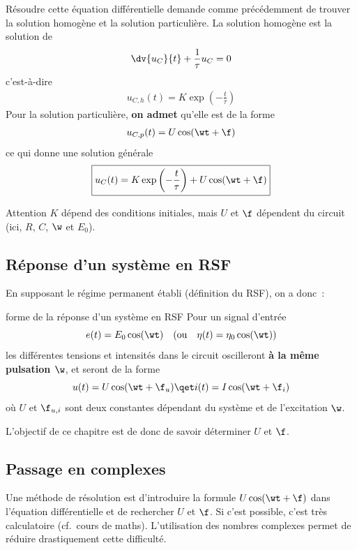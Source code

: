\documentclass[../main/main.tex]{subfiles}
\begin{document}
Résoudre cette équation différentielle demande comme précédemment de trouver la
solution homogène et la solution particulière. La solution homogène est la
solution de
\begin{gather*}
    \dv{u_C}{t} + \frac{1}{\tau}u_C = 0
\end{gather*}
c'est-à-dire
\begin{gather*}
    u_{C,h}(t) = K\exp \left( - \frac{t}{\tau} \right)
\end{gather*}
Pour la solution particulière, \textbf{on admet} qu'elle est de la forme
\begin{gather*}
    u_{C,p}(t) = U\cos(\wt + \f)
\end{gather*}
ce qui donne une solution générale
\[\boxed{u_C(t) = K\exp \left( - \frac{t}{\tau} \right) + U\cos(\wt + \f)}\]

\begin{ror}[label=ror:CIounon, hand]{Attention}
    $K$ dépend des conditions initiales, mais\smallbreak
    \centering\large $U$ et $\f$ dépendent du circuit (ici, $R$, $C$, $\w$ et $E_0$).
\end{ror}

\subsection{Réponse d'un système en RSF}
En supposant le régime permanent établi (définition du RSF), on a donc~:
\begin{prop}[label=prop:sortiersf, heart]{forme de la réponse d'un système en RSF}
    Pour un signal d'entrée
    \[e(t) = E_0 \cos(\wt)
    \quad(\text{ou}\quad
    \eta(t) = \eta_0\cos(\wt))\]
    les différentes tensions et intensités dans le circuit oscilleront \textbf{à
    la même pulsation $\w$}, et seront de la forme
    \[u(t) = U\cos(\wt+\f_u)
    \qet
    i(t) = I\cos(\wt+\f_i)\]
    où $U$ et $\f_{u,i}$ sont deux constantes dépendant du système et de l'excitation
    $\w$.
\end{prop}
\begin{rror}{}
    L'objectif de ce chapitre est de donc de savoir déterminer $U$ et $\f$.
\end{rror}
\vspace{-30pt}
\subsection{Passage en complexes}
Une méthode de résolution est d'introduire la formule $U\cos(\wt+\f)$ dans
l'équation différentielle et de rechercher $U$ et $\f$. Si c'est possible, c'est
très calculatoire (cf.\ cours de maths). L'utilisation des nombres complexes
permet de réduire drastiquement cette difficulté. \bigbreak
\end{document}
